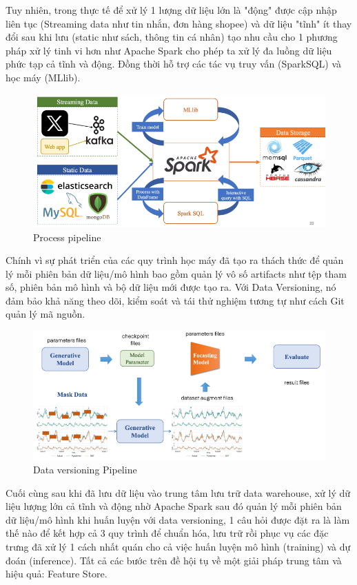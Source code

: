 \documentclass[11pt]{article}
\begin{document}
Tuy nhiên, trong thực tế để xử lý 1 lượng dữ liệu lớn là "động" được cập nhập liên tục (Streaming data như tin nhắn, đơn hàng shopee) và dữ liệu "tĩnh" ít thay đổi sau khi lưu (static như sách, thông tin cá nhân) tạo nhu cầu cho 1 phương pháp xử lý tinh vi hơn như Apache Spark cho phép ta xử lý đa luồng dữ liệu phức tạp cả tĩnh và động. Đồng thời hỗ trợ các tác vụ truy vấn (SparkSQL) và học máy (MLlib).
\begin{figure}[H]
    \centering
    \includegraphics[width=0.8\linewidth]{images/proces.png}
    \caption{Process pipeline}
\end{figure}

Chính vì sự phát triển của các quy trình học máy đã tạo ra thách thức để quản lý mỗi phiên bản dữ liệu/mô hình bao gồm quản lý vô số artifacts như tệp tham số, phiên bản mô hình và bộ dữ liệu mới được tạo ra. Với Data Versioning, nó đảm bảo khả năng theo dõi, kiểm soát và tái thử nghiệm tương tự như cách Git quản lý mã nguồn. 
\begin{figure}[H]
    \centering
    \includegraphics[width=0.8\linewidth]{images/dt_ver.png}
    \caption{Data versioning Pipeline}
\end{figure}

Cuối cùng sau khi đã lưu dữ liệu vào trung tâm lưu trữ data warehouse, xử lý dữ liệu lượng lớn cả tĩnh và động nhờ Apache Spark sau đó quản lý mỗi phiên bản dữ liệu/mô hình khi huấn luyện với data versioning, 1 câu hỏi được đặt ra là làm thế nào để kết hợp cả 3 quy trình để chuẩn hóa, lưu trữ rồi phục vụ các đặc trưng đã xử lý 1 cách nhất quán cho cả việc huấn luyện mô hình (training) và dự đoán (inference). Tất cả các bước trên đề hội tụ về một giải pháp trung tâm và hiệu quả: Feature Store. 
\end{document}
